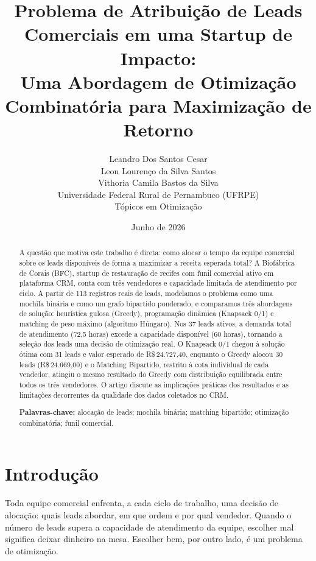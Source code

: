 \documentclass[12pt,a4paper]{article}
\title{%
  \textbf{Problema de Atribui\c{c}\~{a}o de Leads Comerciais em uma Startup de Impacto:\\
  Uma Abordagem de Otimiza\c{c}\~{a}o Combinat\'{o}ria para Maximiza\c{c}\~{a}o de Retorno}
}
\author{%
  Leandro Dos Santos Cesar\\
  Leon Louren\c{c}o da Silva Santos\\
  Vithoria Camila Bastos da Silva\\[0.4em]
  \small Universidade Federal Rural de Pernambuco (UFRPE)\\
  \small T\'{o}picos em Otimiza\c{c}\~{a}o
}
\date{Junho de 2026}
\begin{document}
\maketitle
\thispagestyle{empty}

\begin{abstract}
\noindent
A quest\~{a}o que motiva este trabalho \'{e} direta: como alocar o tempo da equipe
comercial sobre os leads dispon\'{i}veis de forma a maximizar a receita esperada
total? A Biof\'{a}brica de Corais (BFC), startup de restaura\c{c}\~{a}o de recifes com
funil comercial ativo em plataforma CRM, conta com tr\^{e}s vendedores e capacidade
limitada de atendimento por ciclo. A partir de 113 registros reais de leads,
modelamos o problema como uma mochila bin\'{a}ria e como um grafo bipartido
ponderado, e comparamos tr\^{e}s abordagens de solu\c{c}\~{a}o: heur\'{i}stica gulosa (Greedy),
programa\c{c}\~{a}o din\^{a}mica (Knapsack 0/1) e matching de peso m\'{a}ximo (algoritmo
H\'{u}ngaro). Nos 37 leads ativos, a demanda total de atendimento (72,5 horas)
excede a capacidade dispon\'{i}vel (60 horas), tornando a sele\c{c}\~{a}o dos leads
uma decis\~{a}o de otimiza\c{c}\~{a}o real. O Knapsack 0/1 chegou \`{a} solu\c{c}\~{a}o
\'{o}tima com 31 leads e valor esperado de R\$\,24.727,40, enquanto o Greedy
alocou 30 leads (R\$\,24.669,00) e o Matching Bipartido, restrito \`{a} cota
individual de cada vendedor, atingiu o mesmo resultado do Greedy com distribui\c{c}\~{a}o
equilibrada entre todos os tr\^{e}s vendedores. O artigo discute as implica\c{c}\~{o}es pr\'{a}ticas dos resultados e as
limita\c{c}\~{o}es decorrentes da qualidade dos dados coletados no CRM.

\medskip\noindent
\textbf{Palavras-chave:} aloca\c{c}\~{a}o de leads; mochila bin\'{a}ria; matching bipartido;
otimiza\c{c}\~{a}o combinat\'{o}ria; funil comercial.
\end{abstract}

\newpage
\tableofcontents
\newpage

\section{Introdu\c{c}\~{a}o}

Toda equipe comercial enfrenta, a cada ciclo de trabalho, uma decis\~{a}o de aloca\c{c}\~{a}o:
quais leads abordar, em que ordem e por qual vendedor. Quando o n\'{u}mero de leads
supera a capacidade de atendimento da equipe, escolher mal significa deixar
dinheiro na mesa. Escolher bem, por outro lado, \'{e} um problema de otimiza\c{c}\~{a}o.
\end{document}
